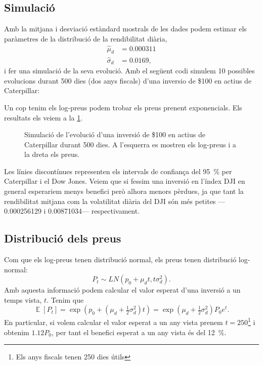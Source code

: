 \documentclass{article}
\numberwithin{table}{section}
\numberwithin{figure}{section}
\numberwithin{equation}{section}
\DeclareMathOperator{\E}{\mathbb{E}}
\begin{document}
\subsection{Simulació}
Amb la mitjana i desviació estàndard mostrals de les dades podem estimar els paràmetres de la distribució de la rendibilitat diària, 
\begin{equation} \label{eq:parametres}
	\begin{aligned}
		\hat{\mu}_d &= 0.000311 \\
		\hat{\sigma}_d&	= 0.0169,
	\end{aligned}
\end{equation}
i fer una simulació de la seva evolució. Amb el següent codi simulem 10 possibles evolucions durant 500 dies (dos anys fiscals) d'una inversio de \$100 en actius de Caterpillar:

Un cop tenim els log-preus podem trobar els preus prenent exponencials. Els resultats els veiem a la \cref{fig:simulacio}.
\begin{figure}[htb]
	\centering \sffamily \small
	
	\caption{Simulació de l'evolució d'una inversió de \$100 en actius de Caterpillar durant 500 dies. A l'esquerra es mostren els log-preus i a la dreta els preus.}
	\label{fig:simulacio}
\end{figure}
Les línies discontínues representen els intervals de confiança del \SI{95}{\percent} per Caterpillar i el Dow Jones. Veiem que si fessim una inversió en l'índex DJI en general esperariem menys benefici però alhora menors pèrdues, ja que tant la rendibilitat mitjana com la volatilitat diària del DJI són més petites ---\num{0.000256129} i \num{0.00871034}--- respectivament.

\subsection{Distribució dels preus}
Com que els log-preus tenen distribució normal, els preus tenen distribució log-normal:
\begin{equation} \label{eqn:distribucio preus}
	P_t \sim LN(p_0 + \mu_d t, t\sigma_d^2).
\end{equation}
Amb aquesta informació podem calcular el valor esperat d'una inversió a un temps vista, \( t \). Tenim que
\begin{equation*}
	\E[P_t] = \exp\left(p_0 + \left(\mu_d + \tfrac{1}{2}\sigma_d^2\right)t\right) = \exp\left(\mu_d + \tfrac{1}{2}\sigma_d^2\right)P_0e^t.
\end{equation*}
En particular, si volem calcular el valor esperat a un any vista prenem \( t = 250 \)\footnote{Els anys fiscals tenen 250 dies útils} i obtenim \( 1.12P_0 \), per tant el benefici esperat a un any vista és del \SI{12}{\percent}.
\end{document}
